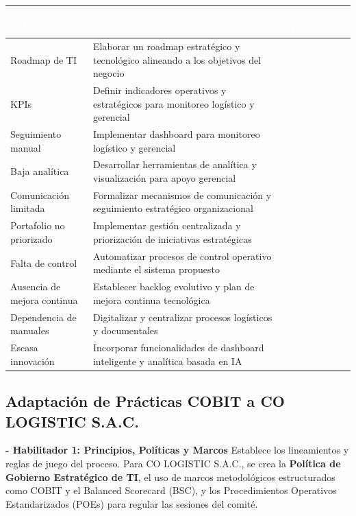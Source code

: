 \documentclass[11pt]{article}
\newcounter{none} %
\begin{document}
\vspace{0.3cm}
\setlength{\tabcolsep}{5pt}
\renewcommand{\arraystretch}{1.5}
{\def\LTcaptype{none}
\begin{longtable}[]{@{}
  >{\raggedright\arraybackslash}p{0.24\linewidth}
  >{\raggedright\arraybackslash}p{0.56\linewidth}
  >{\centering\arraybackslash}p{0.20\linewidth}@{}}
\rowcolor{DeepNavy}
\textcolor{white}{\textbf{GAP}} & \textcolor{white}{\textbf{Acción recomendada}} & \textcolor{white}{\textbf{Prioridad (1-10)}} \\ \hline
\endhead
\rowcolor{LightGray}
Roadmap de TI & Elaborar un roadmap estratégico y tecnológico alineando a los objetivos del negocio & 6 \\ \hline
KPIs & Definir indicadores operativos y estratégicos para monitoreo logístico y gerencial & 1 \\ \hline
\rowcolor{LightGray}
Seguimiento manual & Implementar dashboard para monitoreo logístico y gerencial & 2 \\ \hline
Baja analítica & Desarrollar herramientas de analítica y visualización para apoyo gerencial & 3 \\ \hline
\rowcolor{LightGray}
Comunicación limitada & Formalizar mecanismos de comunicación y seguimiento estratégico organizacional & 8 \\ \hline
Portafolio no priorizado & Implementar gestión centralizada y priorización de iniciativas estratégicas & 7 \\ \hline
\rowcolor{LightGray}
Falta de control & Automatizar procesos de control operativo mediante el sistema propuesto & 4 \\ \hline
Ausencia de mejora continua & Establecer backlog evolutivo y plan de mejora continua tecnológica & 9 \\ \hline
\rowcolor{LightGray}
Dependencia de manuales & Digitalizar y centralizar procesos logísticos y documentales & 5 \\ \hline
Escasa innovación & Incorporar funcionalidades de dashboard inteligente y analítica basada en IA & 10 \\ \hline
\end{longtable}
}

\subsection{Adaptación de Prácticas COBIT a CO LOGISTIC S.A.C.}

\textbf{- Habilitador 1: Principios, Políticas y Marcos}
Establece los lineamientos y reglas de juego del proceso. Para CO LOGISTIC S.A.C., se crea la \textbf{Política de Gobierno Estratégico de TI}, el uso de marcos metodológicos estructurados como COBIT y el Balanced Scorecard (BSC), y los Procedimientos Operativos Estandarizados (POEs) para regular las sesiones del comité.
\end{document}
